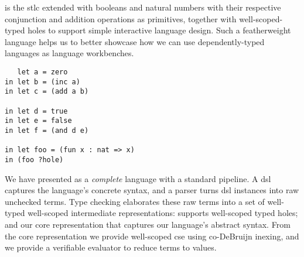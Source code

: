 

\Velo{} is the \ac{stlc} extended with booleans and natural numbers with their respective conjunction and addition operations as primitives, together with well-scoped-typed holes to support simple interactive language design.
Such a featherweight language helps us to better showcase how we can use dependently-typed languages as language workbenches.

\begin{verbatim}
   let a = zero
in let b = (inc a)
in let c = (add a b)

in let d = true
in let e = false
in let f = (and d e)

in let foo = (fun x : nat => x)
in (foo ?hole)

\end{verbatim}

We have presented \Velo{} as a \emph{complete} language with a standard pipeline.
A \ac{dsl} captures the language's concrete syntax, and a parser turns \ac{dsl} instances into raw unchecked terms.
Type checking elaborates these raw terms into a set of well-typed well-scoped intermediate representations:  supports well-scoped typed holes; and  our core representation that captures our language's abstract syntax.
From the core representation we provide well-scoped \ac{cse} using co-DeBruijn inexing, and we provide a verifiable evaluator to reduce terms to values.



